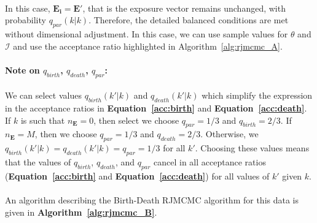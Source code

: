 \documentclass{article}
\begin{document}
\paragraph{}In this case, $\mathbf{E_i} = \mathbf{E'}$, that is the exposure vector remains unchanged, with probability $q_{par}(k|k)$. Therefore, the detailed balanced conditions are met without dimensional adjustment. In this case, we can use sample values for $\theta$ and $\mathcal{I}$ and use the acceptance ratio highlighted in Algorithm~\ref{alg:rjmcmc_A}.

\paragraph{Note on $q_{birth}$, $q_{death}$, $q_{par}$:} We can select values $q_{birth}(k' | k)$ and $q_{death}(k' | k)$ which simplify the expression in the acceptance ratios in \textbf{Equation~\ref{acc:birth}} and \textbf{Equation~\ref{acc:death}}. If $k$ is such that $n_{\mathbf{E}} = 0$, then select we choose $q_{par} = 1/3$ and $q_{birth} = 2/3$. If  $n_{\mathbf{E}} = M$, then we choose $q_{par} = 1/3$ and $q_{death} = 2/3$. Otherwise, we  $q_{birth}(k' | k) = q_{death}(k' | k) = q_{par} = 1/3$ for all $k'$. Choosing these values means that the values of $q_{birth}$, $q_{death}$, and $q_{par}$ cancel in all acceptance ratios (\textbf{Equation~\ref{acc:birth}} and \textbf{Equation~\ref{acc:death}}) for all values of $k'$ given $k$.

\paragraph{} An algorithm describing the Birth-Death RJMCMC algorithm for this data is given in \textbf{Algorithm~\ref{alg:rjmcmc_B}}.
\end{document}
